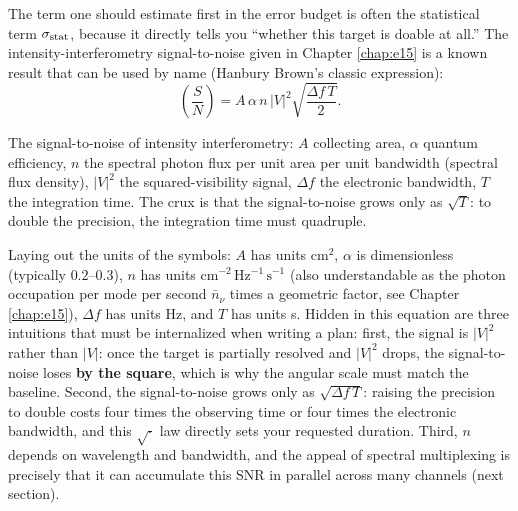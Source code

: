 The term one should estimate first in the error budget is often the statistical term \(\sigma_{\rm stat}\), because it directly tells you ``whether this target is doable at all.'' The intensity-interferometry signal-to-noise given in Chapter \ref{chap:e15} is a known result that can be used by name (Hanbury Brown's classic expression):
\begin{equation}
  \left(\frac{S}{N}\right)
  =
  A\,\alpha\,n\,|V|^2
  \sqrt{\frac{\Delta f\,T}{2}} .
  \label{eq:e28-snr}
\end{equation}
\begin{formulaexplain}
The signal-to-noise of intensity interferometry: \(A\) collecting area, \(\alpha\) quantum efficiency, \(n\) the spectral photon flux per unit area per unit bandwidth (spectral flux density), \(|V|^2\) the squared-visibility signal, \(\Delta f\) the electronic bandwidth, \(T\) the integration time. The crux is that the signal-to-noise grows only as \(\sqrt{T}\): to double the precision, the integration time must quadruple.
\end{formulaexplain}
Laying out the units of the symbols: \(A\) has units \(\mathrm{cm^2}\), \(\alpha\) is dimensionless (typically \(0.2\text{--}0.3\)), \(n\) has units \(\mathrm{cm^{-2}\,Hz^{-1}\,s^{-1}}\) (also understandable as the photon occupation per mode per second \(\bar n_\nu\) times a geometric factor, see Chapter \ref{chap:e15}), \(\Delta f\) has units Hz, and \(T\) has units s. Hidden in this equation are three intuitions that must be internalized when writing a plan: first, the signal is \(|V|^2\) rather than \(|V|\): once the target is partially resolved and \(|V|^2\) drops, the signal-to-noise loses \textbf{by the square}, which is why the angular scale must match the baseline. Second, the signal-to-noise grows only as \(\sqrt{\Delta f\,T}\): raising the precision to double costs four times the observing time or four times the electronic bandwidth, and this \(\sqrt{\cdot}\) law directly sets your requested duration. Third, \(n\) depends on wavelength and bandwidth, and the appeal of spectral multiplexing is precisely that it can accumulate this SNR in parallel across many channels (next section).


